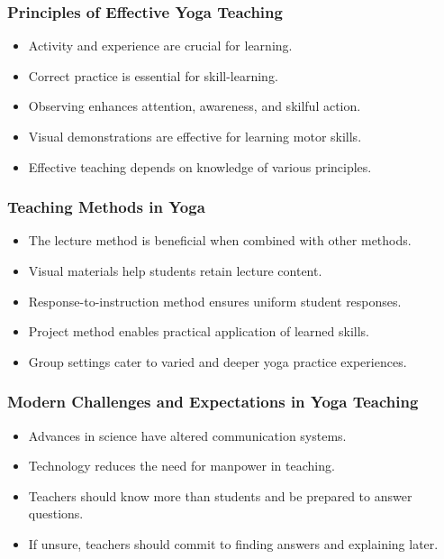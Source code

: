 \begin{frame}[fragile]\frametitle{Principles of Effective Yoga Teaching}
      \begin{itemize}
          \item Activity and experience are crucial for learning.
          \item Correct practice is essential for skill-learning.
          \item Observing enhances attention, awareness, and skilful action.
          \item Visual demonstrations are effective for learning motor skills.
          \item Effective teaching depends on knowledge of various principles.
      \end{itemize}
\end{frame}

\begin{frame}[fragile]\frametitle{Teaching Methods in Yoga}
      \begin{itemize}
          \item The lecture method is beneficial when combined with other methods.
          \item Visual materials help students retain lecture content.
          \item Response-to-instruction method ensures uniform student responses.
          \item Project method enables practical application of learned skills.
          \item Group settings cater to varied and deeper yoga practice experiences.
      \end{itemize}
\end{frame}

\begin{frame}[fragile]\frametitle{Modern Challenges and Expectations in Yoga Teaching}
      \begin{itemize}
          \item Advances in science have altered communication systems.
          \item Technology reduces the need for manpower in teaching.
          \item Teachers should know more than students and be prepared to answer questions.
          \item If unsure, teachers should commit to finding answers and explaining later.
      \end{itemize}
\end{frame}



